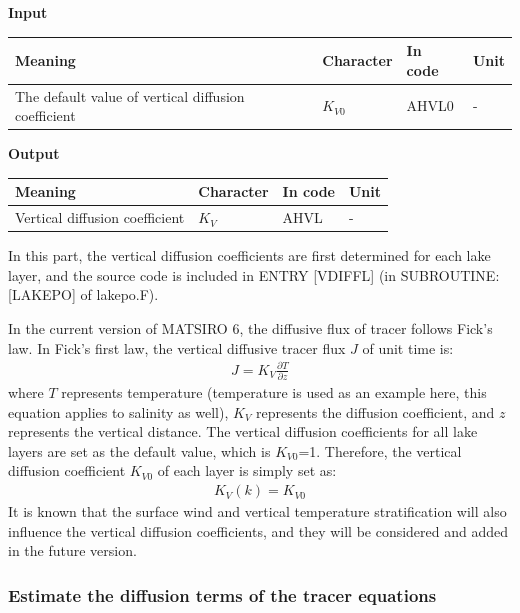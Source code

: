 \textbf{Input}

\begin{longtable}[]{@{}llll@{}}
\toprule\noalign{}
Meaning & Character & In code & Unit \\
\midrule\noalign{}
\endhead
\bottomrule\noalign{}
\endlastfoot
The default value of vertical diffusion coefficient & \(K_{V0}\) & AHVL0 & - \\
\end{longtable}

\textbf{Output}

\begin{longtable}[]{@{}llll@{}}
\toprule\noalign{}
Meaning & Character & In code & Unit \\
\midrule\noalign{}
\endhead
\bottomrule\noalign{}
\endlastfoot
Vertical diffusion coefficient & \(K_{V}\) & AHVL & - \\
\end{longtable}

In this part, the vertical diffusion coefficients are first determined for each lake layer, and the source code is included in ENTRY {[}VDIFFL{]} (in SUBROUTINE: {[}LAKEPO{]} of lakepo.F).

In the current version of MATSIRO 6, the diffusive flux of tracer follows Fick's law. In Fick's first law, the vertical diffusive tracer flux \(J\) of unit time is: \begin{eqnarray}
J=K_{V}\frac{\partial T}{\partial z}
\end{eqnarray} where \(T\) represents temperature (temperature is used as an example here, this equation applies to salinity as well), \(K_{V}\) represents the diffusion coefficient, and \(z\) represents the
vertical distance. The vertical diffusion coefficients for all lake layers are set as the default value, which is \(K_{V0}\)=1. Therefore, the vertical diffusion coefficient \(K_{V0}\) of each layer
is simply set as: \begin{eqnarray}
K_{V}(k)=K_{V0}
\end{eqnarray} It is known that the surface wind and vertical temperature stratification will also influence the vertical diffusion coefficients, and they will be considered and added in the future version.

\subsubsection{Estimate the diffusion terms of the tracer equations}\label{estimate-the-diffusion-terms-of-the-tracer-equations}

